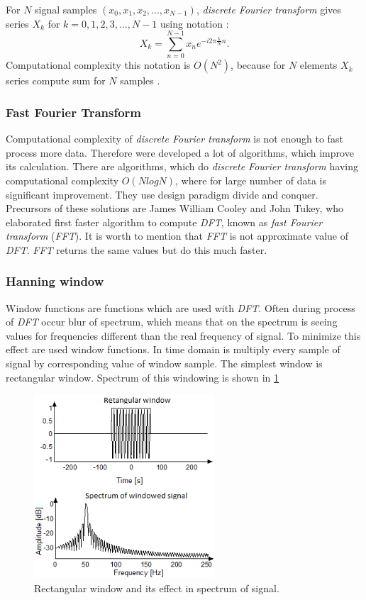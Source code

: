 \documentclass[11pt,titlepage]{article}
\theoremstyle{plain}
\begin{document}
For $N$ signal samples $(x_0,x_1,x_2,...,x_{N-1})$, \textit{discrete Fourier transform} gives series $X_k$ for $k = 0,1, 2, 3, ..., N-1$ using notation \cite{fourier}:
\begin{equation}
	X_k =  \sum\limits_{n=0}^{N-1} x_ne^{-i2\pi \frac{k}{N}n}.
\end{equation}
Computational complexity this notation is $O(N^2)$, because for $N$ elements $X_k$ series compute sum for $N$ samples \cite{fast_fourier}.

\subsubsection{Fast Fourier Transform}
Computational complexity of \textit{discrete Fourier transform} is not enough to fast process more data. Therefore were developed a lot of algorithms, which improve its calculation. There are algorithms, which do \textit{discrete Fourier transform} having computational complexity $O(NlogN)$, where for large number of data is significant improvement. They use design paradigm divide and conquer. Precursors of these solutions are James William Cooley and John Tukey, who elaborated first faster algorithm to compute \textit{DFT}, known as \textit{fast Fourier transform} (\textit{FFT}). It is worth to mention that \textit{FFT} is not approximate value of \textit{DFT}. \textit{FFT} returns the same values but do this much faster.

\subsubsection{Hanning window}
Window functions are functions which are used with \textit{DFT}. Often during process of \textit{DFT} occur blur of spectrum, which means that on the spectrum is seeing values for frequencies different than the real frequency of signal. To minimize this effect are used window functions. In time domain is multiply every sample of signal by corresponding value of window sample. The simplest window is rectangular window. Spectrum of this windowing is shown in \ref{fig:F9}
\begin{figure}[H]
	\centering
	\includegraphics[width=0.6\textwidth]{img/rectangular_window}
	\caption{Rectangular window and its effect in spectrum of signal.}
	\label{fig:F9}
\end{figure}
\end{document}
